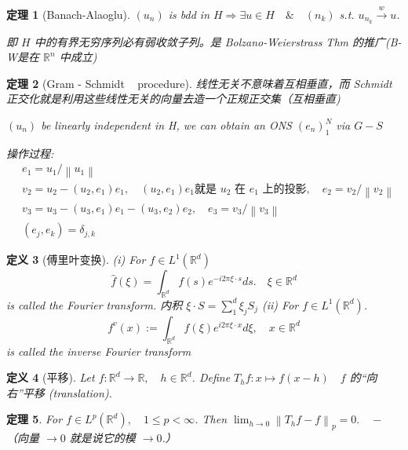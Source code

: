 \documentclass[10pt,openany]{book}
\theoremstyle{thmstyle} %
\newtheorem{theorem}{定理}[chapter]
\theoremstyle{defstyle} %
\newtheorem{definition}[theorem]{定义}
\theoremstyle{prostyle} %
\begin{document}
\begin{theorem}[Banach-Alaoglu]
   $\left(u_n\right)$ is bdd in $H \Rightarrow \exists u \in H \quad \& \quad\left(n_k\right)$ s.t. $u_{n_k} \xrightarrow{w} u$.
   
   即 $H$ 中的有界无穷序列必有弱收敛子列。是 Bolzano-Weierstrass Thm 的推广(B-W是在 $\mathbb{R}^n$ 中成立)
\end{theorem}


\begin{theorem}[Gram - Schmidt ~ procedure]

线性无关不意味着互相垂直，而 Schmidt 正交化就是利用这些线性无关的向量去造一个正规正交集（互相垂直)

$\left(u_n\right)$ be linearly independent in H, we can obtain an ONS $\left(e_n\right)_1^N$ via $G-S$

操作过程: 
$$
\begin{aligned}
& e_1=u_1 /\left\|u_1\right\| \\
& v_2=u_2-\left(u_2, e_1\right) e_1,\quad \text{$\left(u_2, e_1\right) e_1$就是 $u_2$ 在 $e_1$ 上的投影}, \quad e_2=v_2 /\left\|v_2\right\| \\
& v_3=u_3-\left(u_3, e_1\right) e_1-\left(u_3, e_2\right) e_2, \quad e_3=v_3 /\left\|v_3\right\|  \\
& \left(e_j, e_k\right)=\delta_{j, k}
\end{aligned}
$$
\end{theorem}


\begin{definition}[傅里叶变换]
(i) For $f \in L^{1}\left(\mathbb{R}^d\right)$ 
$$
\hat{f}(\xi)=\int_{\mathbb{R}^d} f(s) e^{-i 2 \pi \xi \cdot s} d s . \quad \xi \in \mathbb{R}^d
$$
is called the Fourier transform. 内积 $\xi \cdot S=\sum_1^d \xi_j S_j$
(ii) For $f \in L^1\left(\mathbb{R}^d\right)$.
$$
f^v(x):=\int_{\mathbb{R}^d} f(\xi) e^{i 2 \pi \xi \cdot x} d \xi, \quad x \in \mathbb{R}^d
$$
is called the inverse Fourier transform
\end{definition}

\begin{definition}[平移]
Let $f: \mathbb{R}^d \rightarrow \mathbb{R}, \quad h \in \mathbb{R}^d$. Define $T_h f: x \mapsto f(x-h) \quad f$ 的“向右”平移 (translation).
\end{definition}

\begin{theorem}
For $f \in L^p\left(\mathbb{R}^d\right), \quad 1 \leqslant p<\infty$. Then $\lim _{h \rightarrow 0}\left\|T_h f-f\right\|_p=0 . \quad-$ （向量 $\rightarrow 0$ 就是说它的模 $\rightarrow 0$.）
\end{theorem}
\end{document}
